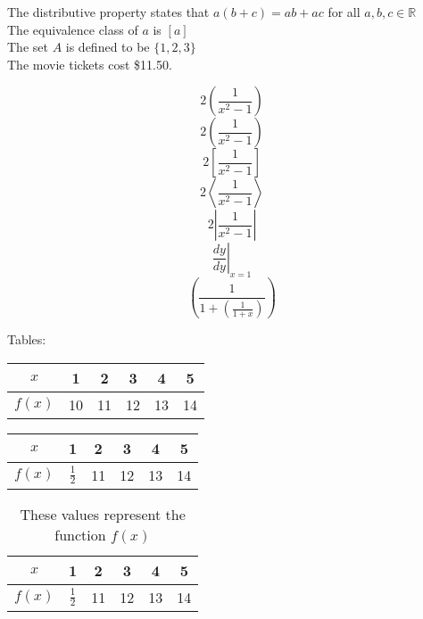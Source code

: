 \documentclass[11pt]{article}
\begin{document}
    The distributive property states that $ a(b+c) = ab + ac $ for all $ a, b, c \in \mathbb{R}$ \\[6pt]
    The equivalence class of $a$ is $[a]$ \\[6pt]
    The set $A$ is defined to be $\{1, 2, 3\}$ \\[6pt] %
    The movie tickets cost \$11.50. %
    
    \[ 2(\frac{1}{x^2-1}) \]
    \[ 2\left(\frac{1}{x^2-1}\right) \] %
    \[ 2\left[\frac{1}{x^2-1}\right] \]
    \[ 2\left \langle \frac{1}{x^2-1}\right \rangle \] %
    \[ 2\left |\frac{1}{x^2-1}\right | \] %
    \[ \left . \frac{dy}{dy}  \right |_{x=1} \] %
    \[ \left ( \frac{1}{1 + \left ( \frac{1}{1+x} \right )} \right ) \]

    Tables:\\
    \begin{tabular}{|c||c|c|c|c|c|} %
        \hline %
        $x$ & 1 & 2 & 3 & 4 & 5 \\ \hline %
        $f(x)$ & 10 & 11 & 12 & 13 & 14 \\ \hline
    \end{tabular}
    
    \vspace{1cm} %

    \begin{tabular}{|c||c|c|c|c|c|} 
        \hline 
        $x$ & 1 & 2 & 3 & 4 & 5 \\ \hline 
        $f(x)$ & $\frac{1}{2}$ & 11 & 12 & 13 & 14 \\ \hline %
    \end{tabular}

    \vspace{1cm}

    \begin{table}[H] %
        \centering %
        \def\arraystretch{1.2} %
            \begin{tabular}{|c||c|c|c|c|c|}
                \hline 
                $x$ & 1 & 2 & 3 & 4 & 5 \\ \hline 
                $f(x)$ & $\frac{1}{2}$ & 11 & 12 & 13 & 14 \\ \hline 
            \end{tabular}
            \caption{These values represent the function $f(x)$} %
        \end{table}    
\end{document}
